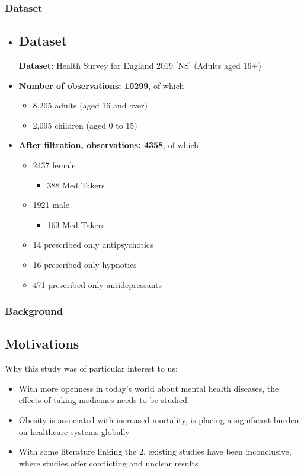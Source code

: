 \documentclass[
	11pt, %
]{beamer}
\begin{document}
\begin{frame}
	\frametitle{Dataset}
	
	\begin{itemize}
		\item \subsection{Dataset} \textbf{Dataset: }Health Survey for England 2019 [NS] (Adults aged 16+)
		\item \textbf{Number of observations: 10299}, of which 
		\begin{itemize}
			\item 8,205 adults (aged 16 and over) 
			\item 2,095 children (aged 0 to 15)
		\end{itemize}
	\item \textbf{After filtration, observations: 4358}, of which 
		\begin{itemize}
			\item 2437 female 
                \begin{itemize}
                    \item 388 Med Takers
                \end{itemize}
			\item 1921 male 
                \begin{itemize}
                    \item 163 Med Takers
                \end{itemize}
		\end{itemize}
  		\begin{itemize}
			\item 14 prescribed only antipsychotics 
			\item 16 prescribed only hypnotics
            \item 471 prescribed only antidepressants
		\end{itemize}
	\end{itemize}
 
\end{frame}

\begin{frame}
	\frametitle{Background} \subsection{Motivations} %
 Why this study was of particular interest to us:	
    \begin{itemize}
        \item With more openness in today's world about mental health diseases, the effects of taking medicines needs to be studied
        \item Obesity is associated with increased mortality, is placing a significant burden on healthcare systems globally
        \item With some literature linking the 2, existing studies have been inconclusive, where studies offer conflicting and unclear results
    \end{itemize}
\end{frame}
\end{document}
